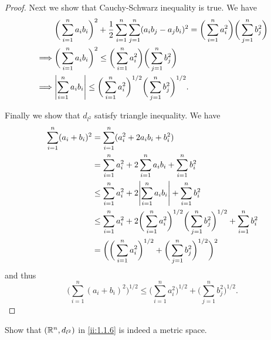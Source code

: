 \begin{proof}
  Next we show that Cauchy-Schwarz inequality is true.
  We have
  \begin{align*}
             & \bigg(\sum_{i = 1}^n a_i b_i\bigg)^2 + \dfrac{1}{2} \sum_{i = 1}^n \sum_{j = 1}^n (a_i b_j - a_j b_i)^2 = \bigg(\sum_{i = 1}^n a_i^2\bigg) \bigg(\sum_{j = 1}^n b_j^2\bigg) \\
    \implies & \bigg(\sum_{i = 1}^n a_i b_i\bigg)^2 \leq \bigg(\sum_{i = 1}^n a_i^2\bigg) \bigg(\sum_{j = 1}^n b_j^2\bigg)                                                                 \\
    \implies & \abs{\sum_{i = 1}^n a_i b_i} \leq \bigg(\sum_{i = 1}^n a_i^2\bigg)^{1 / 2} \bigg(\sum_{j = 1}^n b_j^2\bigg)^{1 / 2}.
  \end{align*}

  Finally we show that \(d_{l^2}\) satisfy triangle inequality.
  We have
  \begin{align*}
    \sum_{i = 1}^n (a_i + b_i)^2 & = \sum_{i = 1}^n (a_i^2 + 2 a_i b_i + b_i^2)                                                                                           \\
                                 & = \sum_{i = 1}^n a_i^2 + 2 \sum_{i = 1}^n a_i b_i + \sum_{i = 1}^n b_i^2                                                               \\
                                 & \leq \sum_{i = 1}^n a_i^2 + 2 \abs{\sum_{i = 1}^n a_i b_i} + \sum_{i = 1}^n b_i^2                                                      \\
                                 & \leq \sum_{i = 1}^n a_i^2 + 2 \bigg(\sum_{i = 1}^n a_i^2\bigg)^{1 / 2} \bigg(\sum_{j = 1}^n b_j^2\bigg)^{1 / 2} + \sum_{i = 1}^n b_i^2 \\
                                 & = \bigg(\bigg(\sum_{i = 1}^n a_i^2\bigg)^{1 / 2} + \bigg(\sum_{j = 1}^n b_j^2\bigg)^{1 / 2}\bigg)^2
  \end{align*}
  and thus
  \[
    \bigg(\sum_{i = 1}^n (a_i + b_i)^2\bigg)^{1 / 2} \leq \bigg(\sum_{i = 1}^n a_i^2\bigg)^{1 / 2} + \bigg(\sum_{j = 1}^n b_j^2\bigg)^{1 / 2}.
  \]
\end{proof}

\begin{ex}\label{ii:ex:1.1.6}
  Show that \((\mathbb{R}^n, d_{l^2})\) in \cref{ii:1.1.6} is indeed a metric space.
\end{ex}

